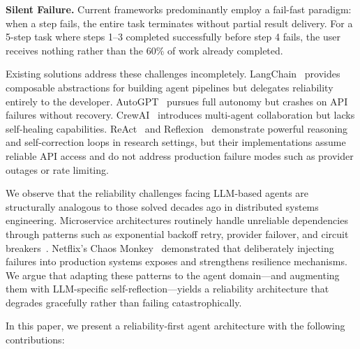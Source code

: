 \documentclass[conference]{IEEEtran}
\begin{document}
\textbf{Silent Failure.} Current frameworks predominantly employ a fail-fast paradigm: when a step fails, the entire task terminates without partial result delivery. For a 5-step task where steps 1--3 completed successfully before step 4 fails, the user receives nothing rather than the 60\% of work already completed.

Existing solutions address these challenges incompletely. LangChain~\cite{chase2023langchain} provides composable abstractions for building agent pipelines but delegates reliability entirely to the developer. AutoGPT~\cite{autogpt2023} pursues full autonomy but crashes on API failures without recovery. CrewAI~\cite{crewai2024} introduces multi-agent collaboration but lacks self-healing capabilities. ReAct~\cite{yao2023react} and Reflexion~\cite{shinn2023reflexion} demonstrate powerful reasoning and self-correction loops in research settings, but their implementations assume reliable API access and do not address production failure modes such as provider outages or rate limiting.

We observe that the reliability challenges facing LLM-based agents are structurally analogous to those solved decades ago in distributed systems engineering. Microservice architectures routinely handle unreliable dependencies through patterns such as exponential backoff retry, provider failover, and circuit breakers~\cite{nygard2007release}. Netflix's Chaos Monkey~\cite{basiri2016chaos} demonstrated that deliberately injecting failures into production systems exposes and strengthens resilience mechanisms. We argue that adapting these patterns to the agent domain---and augmenting them with LLM-specific self-reflection---yields a reliability architecture that degrades gracefully rather than failing catastrophically.

In this paper, we present a reliability-first agent architecture with the following contributions:
\end{document}
